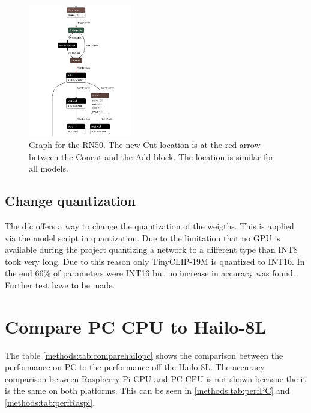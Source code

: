 \begin{figure}[]
    \centering
    \includegraphics[width=0.4\textwidth]{Images/Implementation/secondcutlocation.png}
    \caption{Graph for the RN50. The new Cut location is at the red arrow between the Concat and the Add block.
    The location is similar for all models.}
    \label{methods:fig:rn50newcut}
\end{figure}

\subsection{Change quantization}

The \acrshort{dfc} offers a way to change the quantization of the weigths.
This is applied via the model script in quantization.
Due to the limitation that no GPU is available during the project quantizing a network to a different type than INT8 took very long.
Due to this reason only TinyCLIP-19M is quantized to INT16.
In the end 66\% of parameters were INT16 but no increase in accuracy was found.
Further test have to be made.

\section{Compare PC CPU to Hailo-8L}
The table \ref{methods:tab:comparehailopc} shows the comparison between the performance on PC to the performance off the Hailo-8L.
The accuracy comparison between Raspberry Pi CPU and PC CPU is not shown becasue the it is the same on both platforms.
This can be seen in \cref{methods:tab:perfPC} and \cref{methods:tab:perfRaspi}.

